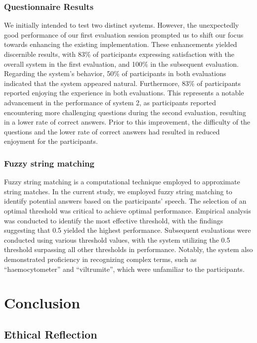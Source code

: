 \documentclass[hidelinks, 11pt]{article}
\begin{document}
\subsubsection{Questionnaire Results}
We initially intended to test two distinct systems. However, the unexpectedly good performance of our first evaluation session prompted us to shift our focus towards enhancing the existing implementation. These enhancements yielded discernible results, with 83\% of participants expressing satisfaction with the overall system in the first evaluation, and 100\% in the subsequent evaluation. Regarding the system's behavior, 50\% of participants in both evaluations indicated that the system appeared natural. Furthermore, 83\% of participants reported enjoying the experience in both evaluations. This represents a notable advancement in the performance of system 2, as participants reported encountering more challenging questions during the second evaluation, resulting in a lower rate of correct answers. Prior to this improvement, the difficulty of the questions and the lower rate of correct answers had resulted in reduced enjoyment for the participants.

\subsubsection{Fuzzy string matching}
Fuzzy string matching is a computational technique employed to approximate string matches. In the current study, we employed fuzzy string matching to identify potential answers based on the participants' speech. The selection of an optimal threshold was critical to achieve optimal performance. Empirical analysis was conducted to identify the most effective threshold, with the findings suggesting that 0.5 yielded the highest performance. Subsequent evaluations were conducted using various threshold values, with the system utilizing the 0.5 threshold surpassing all other thresholds in performance. Notably, the system also demonstrated proficiency in recognizing complex terms, such as ``haemocytometer'' and ``viltrumite'', which were unfamiliar to the participants.

\section{Conclusion}
\label{sec:conclusion}

\subsection{Ethical Reflection}
\label{subsec:ethics}
\end{document}
